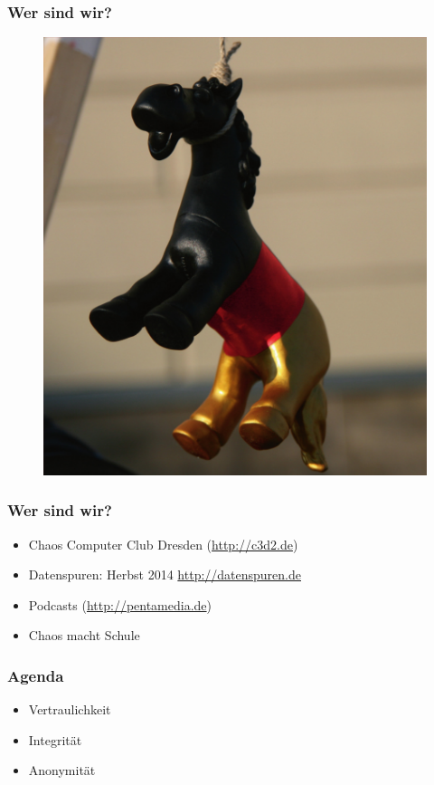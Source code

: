 \documentclass[12pt]{beamer}
\begin{document}
\begin{frame}
  \frametitle{Wer sind wir?}
  \begin{figure}
    \includegraphics[height=0.7\textheight]{img/trojaner.jpg}
  \end{figure}
\end{frame}

\begin{frame}
    \frametitle{Wer sind wir?}
    \begin{itemize}
      \item<1-> Chaos Computer Club Dresden (\url{http://c3d2.de})
          \note{}
      \item<2-> Datenspuren: Herbst 2014 \url{http://datenspuren.de}
      \item<3-> Podcasts (\url{http://pentamedia.de})
      \item<4-> Chaos macht Schule
    \end{itemize}
\end{frame}

\begin{frame}
    \frametitle{Agenda}
    \begin{itemize}
      \item Vertraulichkeit
      \item Integrität
      \item Anonymität
    \end{itemize}
\end{frame}
\end{document}
